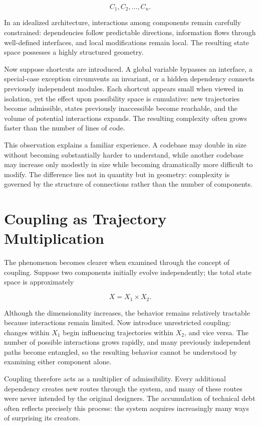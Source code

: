 \documentclass[11pt,oneside]{book}
\theoremstyle{plain}
\theoremstyle{definition}
\theoremstyle{remark}
\begin{document}
\begin{equation}
C_1,C_2,\ldots,C_n.
\end{equation}

In an idealized architecture, interactions among components remain carefully constrained: dependencies follow predictable directions, information flows through well-defined interfaces, and local modifications remain local. The resulting state space possesses a highly structured geometry.

Now suppose shortcuts are introduced. A global variable bypasses an interface, a special-case exception circumvents an invariant, or a hidden dependency connects previously independent modules. Each shortcut appears small when viewed in isolation, yet the effect upon possibility space is cumulative: new trajectories become admissible, states previously inaccessible become reachable, and the volume of potential interactions expands. The resulting complexity often grows faster than the number of lines of code.

This observation explains a familiar experience. A codebase may double in size without becoming substantially harder to understand, while another codebase may increase only modestly in size while becoming dramatically more difficult to modify. The difference lies not in quantity but in geometry: complexity is governed by the structure of connections rather than the number of components.

\section{Coupling as Trajectory Multiplication}

The phenomenon becomes clearer when examined through the concept of coupling. Suppose two components initially evolve independently; the total state space is approximately

\begin{equation}
X
=
X_1
\times
X_2.
\end{equation}

Although the dimensionality increases, the behavior remains relatively tractable because interactions remain limited. Now introduce unrestricted coupling: changes within \(X_1\) begin influencing trajectories within \(X_2\), and vice versa. The number of possible interactions grows rapidly, and many previously independent paths become entangled, so the resulting behavior cannot be understood by examining either component alone.

Coupling therefore acts as a multiplier of admissibility. Every additional dependency creates new routes through the system, and many of these routes were never intended by the original designers. The accumulation of technical debt often reflects precisely this process: the system acquires increasingly many ways of surprising its creators.
\end{document}
